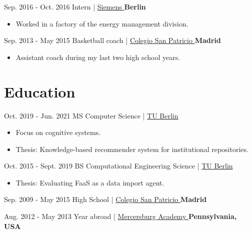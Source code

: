 \documentclass[]{commands}
\begin{document}
\begin{entrylist}
  \entry
    {Sep. 2016 - Oct. 2016}
    {Intern | }
    { \href{https://www.siemens.com/global/en.html}{\small Siemens \faMousePointer}}
    {\normalsize\textbf{\color{ipsgreen}\faMapMarker\space Berlin}}
    {\jobspace
    \begin{itemize}[leftmargin=*, itemsep = 0.1em]
        \item Worked in a factory of the energy management division. \\
    \end{itemize}}
    
  \entry
    {Sep. 2013 - May 2015}
    {Basketball coach | }
    { \href{https://colegiosanpatriciomadrid.com/en/our-campuses/school-el-soto/extra-curricular-activities/}{\small Colegio San Patricio \faMousePointer}}
    {\normalsize\textbf{\color{ipsgreen}\faMapMarker\space Madrid}}
    {\jobspace
    \begin{itemize}[leftmargin=*, itemsep = 0.1em]
        \item Assistant coach during my last two high school years. \\
    \end{itemize}}
    
\end{entrylist}

\section{Education}
\begin{entrylist}
 
   \entry
    {Oct. 2019 - Jun. 2021}
    {MS Computer Science | }
    { \href{https://www.tu.berlin/en/}{\small TU Berlin \faMousePointer}}
    {}
    {\jobspace
    \begin{itemize}[leftmargin=*, itemsep = 0.1em]
        \item Focus on cognitive systems.
        \item Thesis: Knowledge-based recommender system for institutional repositories.\\
    \end{itemize}}
    
  \entry
    {Oct. 2015 - Sept. 2019}
    {BS Computational Engineering Science | }
    { \href{https://www.tu.berlin/en/}{\small TU Berlin \faMousePointer}}
    {}
    {\jobspace
    \begin{itemize}[leftmargin=*, itemsep = 0.1em]
        \item Thesis: Evaluating FaaS as a data import agent.\\
    \end{itemize}}

  \entry
    {Sep. 2009 - May 2015}
    {High School | }
    { \href{https://colegiosanpatriciomadrid.com/en}{\small Colegio San Patricio \faMousePointer}}    {\normalsize\textbf{\color{ipsgreen}\faMapMarker\space Madrid}}
    {}
    
  \entry
    {Aug. 2012 - May 2013}
    {Year abroad | }
    { \href{https://www.mercersburg.edu/}{\small Mercersburg Academy \faMousePointer}}    {\normalsize\textbf{\color{ipsgreen}\faMapMarker\space Pennsylvania, USA}}
    {}
\end{entrylist}
\end{document}
